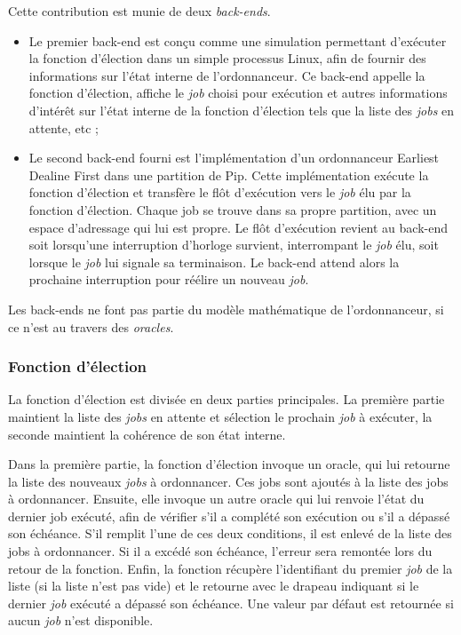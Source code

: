		Cette contribution est munie de deux \emph{back-ends}.
		\begin{itemize}
			\item Le premier back-end est conçu comme une simulation permettant d'exécuter la fonction d'élection dans un simple processus Linux, afin de fournir des informations sur l'état interne de l'ordonnanceur. Ce back-end appelle la fonction d'élection, affiche le \emph{job} choisi pour exécution et autres informations d'intérêt sur l'état interne de la fonction d'élection tels que la liste des \emph{jobs} en attente, etc ;

			\item Le second back-end fourni est l'implémentation d'un ordonnanceur Earliest Dealine First dans une partition de Pip. Cette implémentation exécute la fonction d'élection et transfère le flôt d'exécution vers le \emph{job} élu par la fonction d'élection. Chaque job se trouve dans sa propre partition, avec un espace d'adressage qui lui est propre. Le flôt d'exécution revient au back-end soit lorsqu'une interruption d'horloge survient, interrompant le \emph{job} élu, soit lorsque le \emph{job} lui signale sa terminaison. Le back-end attend alors la prochaine interruption pour réélire un nouveau \emph{job}.
		\end{itemize}

		Les back-ends ne font pas partie du modèle mathématique de l'ordonnanceur, si ce n'est au travers des \emph{oracles}.

		\subsubsection{Fonction d'élection}

		La fonction d'élection est divisée en deux parties principales. La première partie maintient la liste des \emph{jobs} en attente et sélection le prochain \emph{job} à exécuter, la seconde maintient la cohérence de son état interne.

		Dans la première partie, la fonction d'élection invoque un oracle, qui lui retourne la liste des nouveaux \emph{jobs} à ordonnancer. Ces jobs sont ajoutés à la liste des jobs à ordonnancer. Ensuite, elle invoque un autre oracle qui lui renvoie l'état du dernier job exécuté, afin de vérifier s'il a complété son exécution ou s'il a dépassé son échéance. S'il remplit l'une de ces deux conditions, il est enlevé de la liste des jobs à ordonnancer. Si il a excédé son échéance, l'erreur sera remontée lors du retour de la fonction. Enfin, la fonction récupère l'identifiant du premier \emph{job} de la liste (si la liste n'est pas vide) et le retourne avec le drapeau indiquant si le dernier \emph{job} exécuté a dépassé son échéance. Une valeur par défaut est retournée si aucun \emph{job} n'est disponible.

